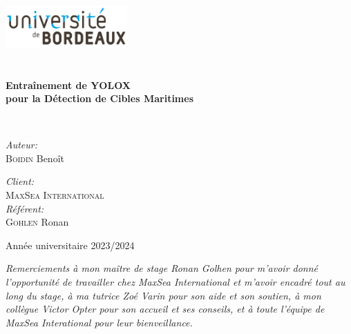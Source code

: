 \begin{titlepage}
    \begin{center}

    \includegraphics[width=0.35\textwidth]{./img/univ_bordeaux_logo.png}~\\[1cm]
    \textsc{\Large }\\[0.5cm]

    \HRule \\[0.4cm]

    {\huge \bfseries Entraînement de YOLOX \\
    pour la Détection de Cibles Maritimes\\[0.4cm] }

    \HRule \\[1.5cm]

    \begin{minipage}{0.4\textwidth}
    \begin{flushleft} \large
    \emph{Auteur:}\\
    \textsc{Boidin} Benoît
    \end{flushleft}
    \end{minipage}
    \begin{minipage}{0.4\textwidth}
    \begin{flushright} \large
    \emph{Client:} \\
    \textsc{MaxSea International}\\
    \emph{Référent:} \\
    \textsc{Gohlen} Ronan
    \end{flushright}
    \end{minipage}

    \vfill

    {\large Année universitaire 2023/2024}

    \end{center}


    \pagebreak

    \vspace*{\fill}

    \textit{Remerciements à mon maître de stage Ronan Golhen pour m'avoir donné l'opportunité de travailler chez MaxSea International
    et m'avoir encadré tout au long du stage,
    à ma tutrice Zoé Varin pour son aide et son soutien,
    à mon collègue Victor Opter pour son accueil et ses conseils,
    et à toute l'équipe de MaxSea Interational pour leur bienveillance. }
    \thispagestyle{empty}
\end{titlepage}
